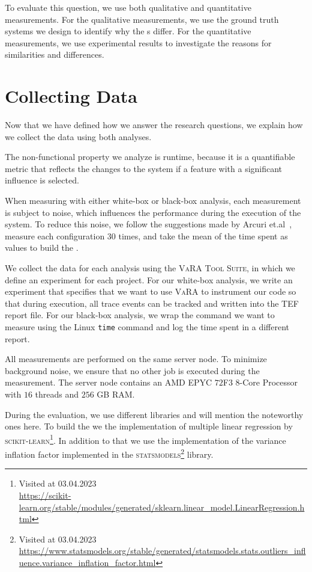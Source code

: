 To evaluate this question, we use both qualitative and quantitative measurements. 
For the qualitative measurements, we use the ground truth systems we design to identify why the {\perfInfluenceModel}s differ. 
For the quantitative measurements, we use experimental results to investigate the reasons for similarities and differences.

\section{Collecting Data}\label{ch:collect-data}
Now that we have defined how we answer the research questions, we explain how we collect the data using both analyses.

The non-functional property we analyze is runtime, because it is a quantifiable metric
that reflects the changes to the system if a feature with a significant influence is selected.

When measuring with either white-box or black-box analysis, 
each measurement is subject to noise, which influences the performance during the execution of the system. 
To reduce this noise, we follow the suggestions made by Arcuri et.al~\cite{SampleSize}, 
measure each configuration 30 times, and take the mean of the time spent as values to build the {\perfInfluenceModel}.

We collect the data for each analysis using the \textsc{VaRA Tool Suite}, in which we define an experiment for each project. 
For our white-box analysis, we write an experiment that specifies that we want to use \textsc{VaRA} to instrument our code so that during execution, 
all trace events can be tracked and written into the TEF report file. For our black-box analysis, 
we wrap the command we want to measure using the Linux \texttt{time} command and log the time spent in a different report. 

All measurements are performed on the same server node. To minimize background noise, we ensure that no other job is executed during the measurement. 
The server node contains an AMD EPYC $72$F$3$  $8$-Core Processor with $16$ threads and $256$ GB RAM.

During the evaluation, we use different libraries and will mention the noteworthy ones here.
To build the {\perfInfluenceModel} we the implementation of multiple linear regression by \textsc{scikit-learn}\footnote{Visited at 03.04.2023\\ \url{https://scikit-learn.org/stable/modules/generated/sklearn.linear_model.LinearRegression.html}}.
In addition to that we use the implementation of the variance inflation factor implemented in the \textsc{statsmodels}\footnote{Visited at 03.04.2023\\ \url{https://www.statsmodels.org/stable/generated/statsmodels.stats.outliers_influence.variance_inflation_factor.html}} library.

